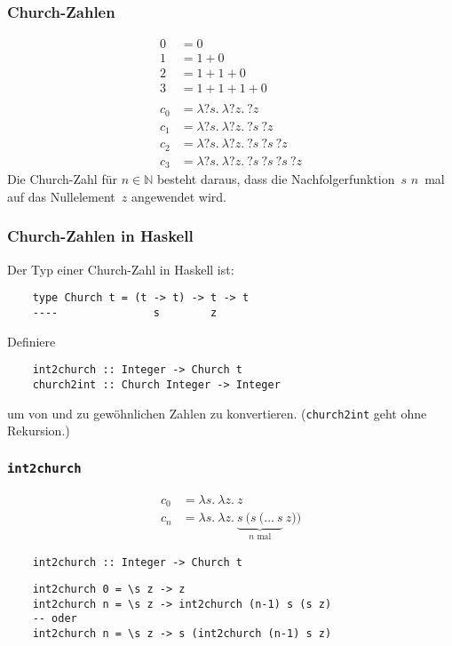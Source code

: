 \documentclass{beamer}
\date{2016-11-28/29}
\begin{document}
\normalsize
\normalem

\begin{frame}[plain]
  \titlepage
\end{frame}

\begin{frame}
  \frametitle{Church-Zahlen}
  \begin{align*}
    0 &= 0 \\
    1 &= 1 + 0 \\
    2 &= 1 + 1 + 0 \\
    3 &= 1 + 1 + 1 + 0 \\
    \\
    c_0 &= λ?s.~λ?z.~?z \\
    c_1 &= λ?s.~λ?z.~?s~?z \\
    c_2 &= λ?s.~λ?z.~?s~?s~?z \\
    c_3 &= λ?s.~λ?z.~?s~?s~?s~?z
  \end{align*}
  Die Church-Zahl für $n∈ℕ$ besteht daraus, dass die Nachfolgerfunktion~$s$ $n$~mal auf das Nullelement~$z$ angewendet wird.
\end{frame}

\begin{frame}[fragile]
  \frametitle{Church-Zahlen in Haskell}
  Der Typ einer Church-Zahl in Haskell ist:
  \begin{lstlisting}
    type Church t = (t -> t) -> t -> t
    ----               s        z
  \end{lstlisting}
  Definiere
  \begin{lstlisting}
    int2church :: Integer -> Church t
    church2int :: Church Integer -> Integer
  \end{lstlisting}
  um von und zu gewöhnlichen Zahlen zu konvertieren.
  (\lstinline{church2int} geht ohne Rekursion.)
\end{frame}

\begin{frame}[fragile]
  \frametitle{\lstinline{int2church}}
  \begin{align*}
    c_0 &= λs.~λz.~z \\
    c_n &= λs.~λz.~\underbrace{s~(s~(\ldots~s}_{\text{$n$ mal}}~z))
  \end{align*}
  \begin{lstlisting}
    int2church :: Integer -> Church t
  \end{lstlisting}
  \pause
  \begin{lstlisting}
    int2church 0 = \s z -> z
    int2church n = \s z -> int2church (n-1) s (s z)
    -- oder
    int2church n = \s z -> s (int2church (n-1) s z)
  \end{lstlisting}
\end{frame}
\end{document}
